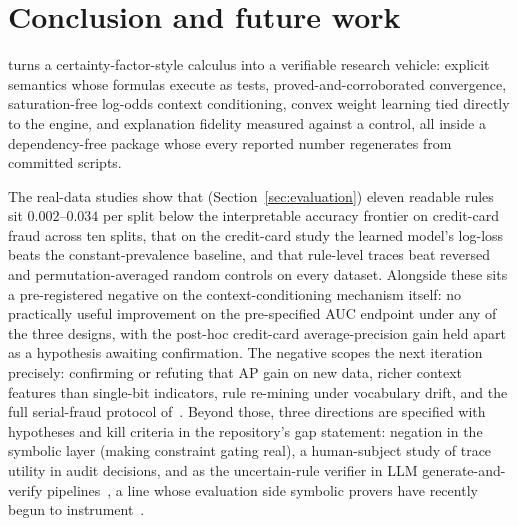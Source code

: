 \section{Conclusion and future work}\label{sec:conclusion}

\pla{} turns a certainty-factor-style calculus into a verifiable
research vehicle: explicit semantics whose formulas execute as tests,
proved-and-corroborated convergence, saturation-free log-odds context
conditioning, convex weight learning tied directly to the engine, and
explanation fidelity measured against a control, all inside a
dependency-free package whose every reported number regenerates from
committed scripts.

The real-data studies show that (Section~\ref{sec:evaluation}) eleven
readable rules sit $0.002$--$0.034$ per split below the interpretable
accuracy frontier on credit-card fraud across ten splits, that on the
credit-card study the learned model's log-loss beats the
constant-prevalence baseline, and that
rule-level traces beat reversed and permutation-averaged random
controls on every dataset. Alongside these sits a pre-registered
negative on
the context-conditioning mechanism itself: no practically useful
improvement on the pre-specified AUC endpoint under any of the three
designs, with the post-hoc credit-card average-precision gain held
apart as a hypothesis awaiting confirmation. The
negative scopes the next iteration precisely: confirming or refuting
that AP gain on new data, richer context features than single-bit
indicators, rule re-mining under vocabulary drift, and the full
serial-fraud protocol of~\cite{bao2020}. Beyond those, three
directions are specified with hypotheses and kill criteria in the
repository's gap statement: negation in the symbolic layer (making
constraint gating real), a human-subject study of trace utility in
audit decisions, and \pla{} as the uncertain-rule verifier in LLM
generate-and-verify pipelines~\cite{kambhampati2024}, a line whose
evaluation side symbolic provers have recently begun to
instrument~\cite{qi2025}.
